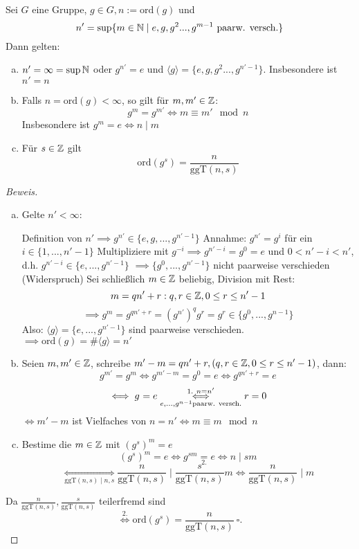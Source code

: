 \documentclass[a4paper]{report}
\begin{document}
\begin{prop} %
Sei $G$ eine Gruppe, $g \in G, n := \mathrm{ord}(g)$ und
$$n' = \sup\{m \in \Bbb N \mid e, g, g^{2} ..., g^{m-1} \text{ paarw. versch.}\}$$
Dann gelten:
\begin{enumerate}[(a)]
\item $n' = \infty = \sup \Bbb N$ oder $g^{n'} = e$ und $\langle g \rangle= \{e, g, g^{2} ..., g^{n'-1}\}$. Insbesondere ist $n'=n$
\item Falls $n = \mathrm{ord}(g) < \infty$, so gilt für $m,m' \in \Bbb Z$: $$g^{m} = g^{m'} \iff m \equiv m' \mod n$$
    Insbesondere ist $g^{m} = e \iff n \mid m$
\item Für $s \in \Bbb Z$ gilt $$\mathrm{ord}(g^{s}) = \frac{n}{\mathrm{ggT}(n,s)}$$
\end{enumerate}
\begin{proof}[Beweis]
  \item
  \begin{enumerate}[(a)]
    \item Gelte $n' < \infty$:

Definition von $n' \implies g^{n'} \in \{e, g, ..., g^{n'-1}\}$
Annahme: $g^{n'} = g^{i}$ für ein $i \in \{1, ..., n'-1\}$
Multipliziere mit $g^{-i} \implies g^{n'-i} = g^{0} = e$ und
$0 < n' - i < n'$, d.h. $g^{n'-i} \in \{e, ..., g^{n'-1}\}$
$\implies \{g^{0}, ..., g^{n'-1}\}$ nicht paarweise verschieden (Widerspruch)
Sei schließlich $m \in \Bbb Z$ beliebig, Division mit Rest: $$m = qn' + r : q,r \in \Bbb Z , 0 \le r \le n' - 1$$
$$\implies g^{m} = g^{qn'+r} = (g^{n'})^{q}g^{r} = g^{r} \in \{g^{0}, ..., g^{n-1}\}$$
Also: $\langle g \rangle = \{e, ..., g^{n'-1}\}$ sind paarweise verschieden. $\implies \mathrm{ord}(g) = \# \langle g \rangle = n'$
\item Seien $m, m' \in \Bbb Z$, schreibe $m'-m = qn'+r, (q, r \in \Bbb Z, 0 \le r \le n'-1)$, dann:
$$g^{m'} = g^{m} \iff g^{m'-m} = g^{0} = e \iff g^{qn'+r} = e$$
$$\iff g^{} = e \overunderset{1.\  n = n'}{e, ..., g^{n-1} \text{paarw. versch.}}\iff r = 0$$
$\iff m' - m$ ist Vielfaches von $n=n' \iff m \equiv m \mod n$
\item Bestime die $m \in \Bbb Z$ mit $(g^{s})^{m} = e$
$$(g^{s})^{m} = e \iff g^{sm} \underset{2.}= e \iff n \mid sm$$
$$\underset{\mathrm{ggT}(n,s) \mid n,s}\iff \frac n{\mathrm{ggT}(n,s)} \mid \frac s{\mathrm{ggT}(n,s)}m \iff \frac{n}{\mathrm{ggT}(n,s)} \mid m$$

  \end{enumerate}

Da $\frac n{\mathrm{ggT}(n,s)},  \frac s{\mathrm{ggT}(n,s)}$ teilerfremd sind
$$\overset{2. }\iff \mathrm{ord}(g^{s}) = \frac n{\mathrm{ggT}(n,s)} \ \square.$$
\end{proof}
\end{prop}
\end{document}
